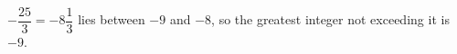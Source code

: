 $-\dfrac{25}3=-8\dfrac13$ lies between $-9$ and $-8$, so the greatest integer not exceeding it is $\boxed{-9}$.
